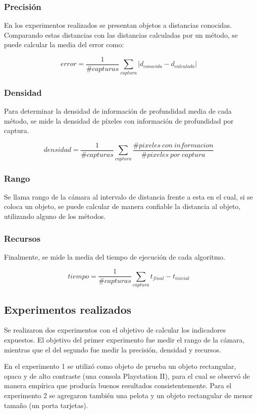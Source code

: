 \documentclass[11pt,a4paper,titlepage]{article}
\begin{document}
\subsubsection{Precisión}

En los experimentos realizados se presentan objetos a distancias conocidas. Comparando estas distancias con las distancias calculadas por un método, se puede calcular la media del error como:

\[
	error=\frac{1}{\#capturas}\sum_{captura}\left|d_{conocida}-d_{calculada}\right|
\]

\subsubsection{Densidad}

Para determinar la densidad de información de profundidad media de cada método, se mide la densidad de píxeles con información de profundidad por captura.

\[
	densidad = \frac{1}{\#capturas} \sum_{captura} {\frac{\#pixeles\ con\ informacion}{\#pixeles\ por\ captura}}
\]

\subsubsection{Rango}

Se llama rango de la cámara al intervalo de distancia frente a esta en el cual, si se coloca un objeto, se puede calcular de manera confiable la distancia al objeto, utilizando alguno de los métodos.

\subsubsection{Recursos}

Finalmente, se mide la media del tiempo de ejecución de cada algoritmo.

\[
	tiempo = \frac{1}{\#capturas} \sum_{captura} {t_{final} - t_{inicial}}
\]

\subsection{Experimentos realizados}

Se realizaron dos experimentos con el objetivo de calcular los indicadores expuestos. El objetivo del primer experimento fue medir el rango de la cámara, mientras que el del segundo fue medir la precisión, densidad y recursos.

En el experimento 1 se utilizó como objeto de prueba un objeto rectangular, opaco y de alto contraste (una consola Playstation II), para el cual se observó de manera empírica que producía buenos resultados consistentemente. Para el experimento 2 se agregaron también una pelota y un objeto rectangular de menor tamaño (un porta tarjetas).
\end{document}
